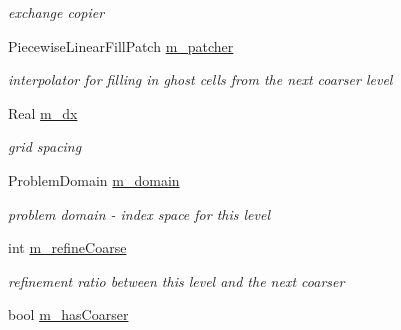 \begin{DoxyCompactItemize}
\begin{DoxyCompactList}\small\item\em exchange copier \end{DoxyCompactList}\item 
\hypertarget{class_level_advect_a5719da936000c1a7e4dcffc9d43aaf97}{Piecewise\-Linear\-Fill\-Patch \hyperlink{class_level_advect_a5719da936000c1a7e4dcffc9d43aaf97}{m\-\_\-patcher}}\label{class_level_advect_a5719da936000c1a7e4dcffc9d43aaf97}

\begin{DoxyCompactList}\small\item\em interpolator for filling in ghost cells from the next coarser level \end{DoxyCompactList}\item 
\hypertarget{class_level_advect_a3ee22e9a3df1f1c2400e6fd989158922}{Real \hyperlink{class_level_advect_a3ee22e9a3df1f1c2400e6fd989158922}{m\-\_\-dx}}\label{class_level_advect_a3ee22e9a3df1f1c2400e6fd989158922}

\begin{DoxyCompactList}\small\item\em grid spacing \end{DoxyCompactList}\item 
\hypertarget{class_level_advect_acc95fd3bf2296642ceb3cd97e733ac41}{Problem\-Domain \hyperlink{class_level_advect_acc95fd3bf2296642ceb3cd97e733ac41}{m\-\_\-domain}}\label{class_level_advect_acc95fd3bf2296642ceb3cd97e733ac41}

\begin{DoxyCompactList}\small\item\em problem domain -\/ index space for this level \end{DoxyCompactList}\item 
\hypertarget{class_level_advect_aba7ddca5882201cdbab13efc47e8635c}{int \hyperlink{class_level_advect_aba7ddca5882201cdbab13efc47e8635c}{m\-\_\-refine\-Coarse}}\label{class_level_advect_aba7ddca5882201cdbab13efc47e8635c}

\begin{DoxyCompactList}\small\item\em refinement ratio between this level and the next coarser \end{DoxyCompactList}\item 
\hypertarget{class_level_advect_a4c6b16c657ec5bf5053dfeae3dae64c0}{bool \hyperlink{class_level_advect_a4c6b16c657ec5bf5053dfeae3dae64c0}{m\-\_\-has\-Coarser}}\label{class_level_advect_a4c6b16c657ec5bf5053dfeae3dae64c0}


\end{DoxyCompactItemize}
